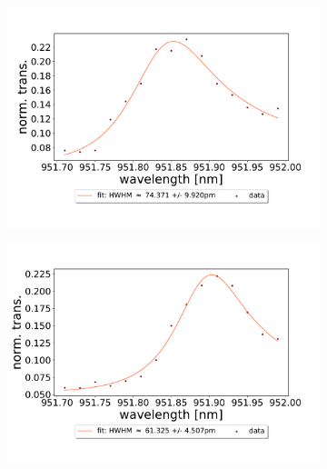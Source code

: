 \begin{figure}[h!]
    \centering
    \begin{subfigure}[b]{0.49\textwidth}
        \includegraphics[width=\textwidth]{figures/results/double fano fits/250um_M3:M5_fit_1.pdf}
        \caption{}
        \label{fig:250um_M3:M5_fit_1}
    \end{subfigure}
    \begin{subfigure}[b]{0.49\textwidth}
        \includegraphics[width=\textwidth]{figures/results/double fano fits/250um_M3:M5_fit_2.pdf}
        \caption{}
        \label{fig:250um_M3:M5_fit_2}
    \end{subfigure}
    \begin{subfigure}[b]{0.49\textwidth}

\end{subfigure}
\end{figure}
